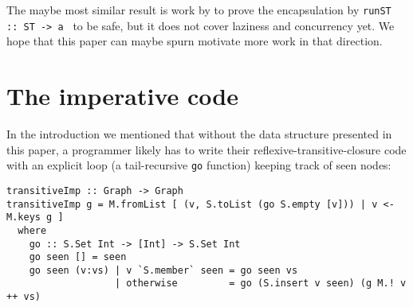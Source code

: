 \documentclass[manuscript,screen,acmsmall]{acmart}
\begin{document}
The maybe most similar result is work by \citet{runST} to prove the encapsulation by \verb|runST :: ST -> a | to be safe, but it does not cover laziness and concurrency yet. We hope that this paper can maybe spurn motivate more work in that direction.
















\clearpage
\appendix
\section{The imperative code}\label{sec:imp}

In the introduction we mentioned that without the data structure presented in this paper, a programmer likely has to write their reflexive-transitive-closure code with an explicit loop (a tail-recursive \verb|go| function) keeping track of seen nodes:
\begin{verbatim}
transitiveImp :: Graph -> Graph
transitiveImp g = M.fromList [ (v, S.toList (go S.empty [v])) | v <- M.keys g ]
  where
    go :: S.Set Int -> [Int] -> S.Set Int
    go seen [] = seen
    go seen (v:vs) | v `S.member` seen = go seen vs
                   | otherwise         = go (S.insert v seen) (g M.! v ++ vs)
\end{verbatim}
\end{document}
